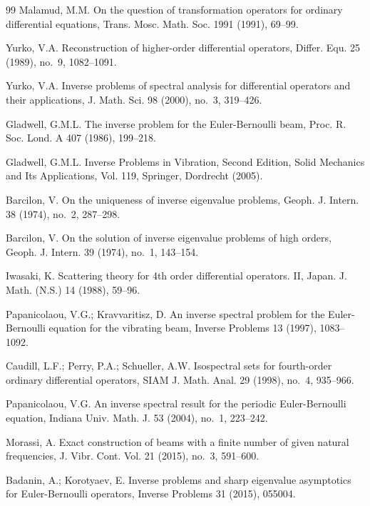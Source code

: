 \documentclass[a4paper,12pt]{article}
\theoremstyle{plain}
\numberwithin{equation}{section}
\theoremstyle{definition}
\theoremstyle{remark}
\begin{document}
\begin{thebibliography}{99}
Malamud, M.M. On the question of transformation operators for ordinary differential equations, Trans. Mosc. Math. Soc. 1991 (1991), 69--99.


Yurko, V.A. Reconstruction of higher-order differential operators, Differ. Equ. 25 (1989), no.~9, 1082--1091.

Yurko, V.A. Inverse problems of spectral analysis for differential operators and their applications, J. Math. Sci. 98 (2000), no.~3, 319--426.


Gladwell, G.M.L. The inverse problem for the Euler-Bernoulli beam, Proc. R. Soc. Lond. A 407 (1986), 199--218.

Gladwell, G.M.L. Inverse Problems in Vibration, Second Edition, Solid Mechanics and Its Applications, Vol. 119, Springer, Dordrecht (2005).


Barcilon, V. On the uniqueness of inverse eigenvalue problems, Geoph. J. Intern. 38 (1974), no.~2, 287--298.

Barcilon, V. On the solution of inverse eigenvalue problems of high orders, Geoph. J. Intern. 39 (1974), no.~1, 143--154.

Iwasaki, K. Scattering theory for 4th order differential operators. II, Japan. J. Math.
(N.S.) 14 (1988), 59--96.

Papanicolaou, V.G.; Kravvaritisz, D. An inverse spectral problem for the Euler-Bernoulli equation for the vibrating beam, Inverse Problems 13 (1997), 1083--1092.

Caudill, L.F.; Perry, P.A.; Schueller, A.W. Isospectral sets for fourth-order ordinary differential operators, SIAM J. Math. Anal. 29 (1998), no.~4, 935--966.

Papanicolaou, V.G.	An inverse spectral result for the periodic Euler-Bernoulli equation, Indiana Univ. Math. J. 53 (2004), no.~1, 223--242.

Morassi, A. Exact construction of beams with a finite
number of given natural frequencies, J. Vibr. Cont.
Vol. 21 (2015), no.~3, 591--600.

Badanin, A.; Korotyaev, E. Inverse problems and sharp eigenvalue asymptotics for Euler-Bernoulli operators, Inverse Problems 31 (2015), 055004.


\end{thebibliography}
\end{document}
